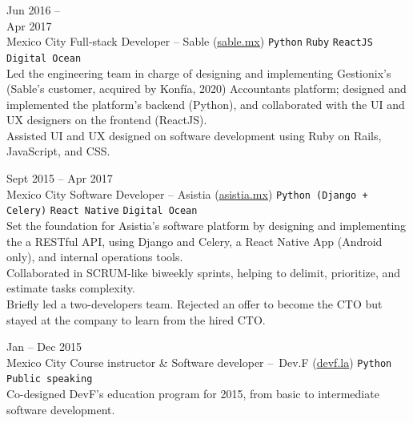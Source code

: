 \documentclass[9pt]{developercv} %
\begin{document}
\begin{entrylist}
    \entry
        {
            Jun 2016 -- \\Apr 2017
            \\\footnotesize{Mexico City}
        }
        {Full-stack Developer – Sable ({\href{https://sable.mx/}{\underline{sable.mx}}})}
        {
            \texttt{Python}
            \slashsep\texttt{Ruby}
            \slashsep\texttt{ReactJS}
            \slashsep\texttt{Digital Ocean}
        }
        {\\
            Led the engineering team in charge of designing and implementing Gestionix's 
            (Sable's customer, acquired by Konfía, 2020) Accountants platform; designed and implemented
            the platform's backend (Python), and collaborated with the UI and UX designers on the 
            frontend (ReactJS).\\

            Assisted UI and UX designed on software development using Ruby on Rails, JavaScript, and CSS.\\            
        }

    \entry
        {
            Sept 2015 -- Apr 2017
            \\\footnotesize{Mexico City}
        }
        {Software Developer – Asistia ({\href{https://www.linkedin.com/company/asistia/}{\underline{asistia.mx}}})}
        {
            \texttt{Python (Django + Celery)}
            \slashsep\texttt{React Native}
            \slashsep\texttt{Digital Ocean}
        }
        {\\
            Set the foundation for Asistia's software platform by designing and implementing the a 
            RESTful API, using Django and Celery, a React Native App (Android only), and internal 
            operations tools.\\

            Collaborated in SCRUM-like biweekly sprints, helping to delimit, prioritize, and estimate 
            tasks complexity.\\
            
            Briefly led a two-developers team. Rejected an offer to become the CTO but stayed at the company to learn from the hired CTO.
        }

    \entry
        {
            Jan -- Dec 2015
            \\\footnotesize{Mexico City}
        }
        {Course instructor \& Software developer – Dev.F ({\href{https://devf.la/}{\underline{devf.la}}})}
        {
            \texttt{Python}
            \slashsep\texttt{Public speaking}
        }
        {\\
            Co-designed DevF's education program for 2015, from basic to intermediate software development. \\

}
\end{entrylist}
\end{document}
